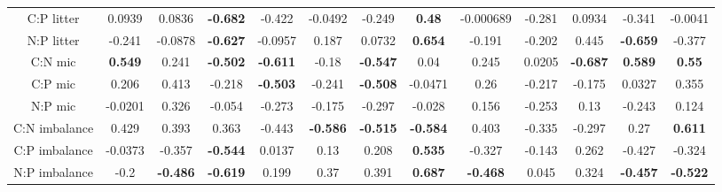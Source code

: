 \documentclass[authoryear,preprint,review,12pt]{elsarticle}
\begin{document}
\begin{landscape}
\begin{table}[h!]
\begin{center}
{\begin{tabular}{ccccccccccccc}
  C:P litter & 0.0939 & 0.0836 & \textbf{ -0.682 } & -0.422 & -0.0492 & -0.249 & \textbf{ 0.48 } & -0.000689 & -0.281 & 0.0934 & -0.341 & -0.0041 \\ 
  N:P litter & -0.241 & -0.0878 & \textbf{ -0.627 } & -0.0957 & 0.187 & 0.0732 & \textbf{ 0.654 } & -0.191 & -0.202 & 0.445 & \textbf{ -0.659 } & -0.377 \\ 
  C:N mic & \textbf{ 0.549 } & 0.241 & \textbf{ -0.502 } & \textbf{ -0.611 } & -0.18 & \textbf{ -0.547 } & 0.04 & 0.245 & 0.0205 & \textbf{ -0.687 } & \textbf{ 0.589 } & \textbf{ 0.55 } \\ 
  C:P mic & 0.206 & 0.413 & -0.218 & \textbf{ -0.503 } & -0.241 & \textbf{ -0.508 } & -0.0471 & 0.26 & -0.217 & -0.175 & 0.0327 & 0.355 \\ 
  N:P mic & -0.0201 & 0.326 & -0.054 & -0.273 & -0.175 & -0.297 & -0.028 & 0.156 & -0.253 & 0.13 & -0.243 & 0.124 \\ 
  C:N imbalance & 0.429 & 0.393 & 0.363 & -0.443 & \textbf{ -0.586 } & \textbf{ -0.515 } & \textbf{ -0.584 } & 0.403 & -0.335 & -0.297 & 0.27 & \textbf{ 0.611 } \\ 
  C:P imbalance & -0.0373 & -0.357 & \textbf{ -0.544 } & 0.0137 & 0.13 & 0.208 & \textbf{ 0.535 } & -0.327 & -0.143 & 0.262 & -0.427 & -0.324 \\ 
  N:P imbalance & -0.2 & \textbf{ -0.486 } & \textbf{ -0.619 } & 0.199 & 0.37 & 0.391 & \textbf{ 0.687 } & \textbf{ -0.468 } & 0.045 & 0.324 & \textbf{ -0.457 } & \textbf{ -0.522 } \\ 
   \hline
\end{tabular}
}
\end{center}
\end{table}\end{landscape}


\end{document}
